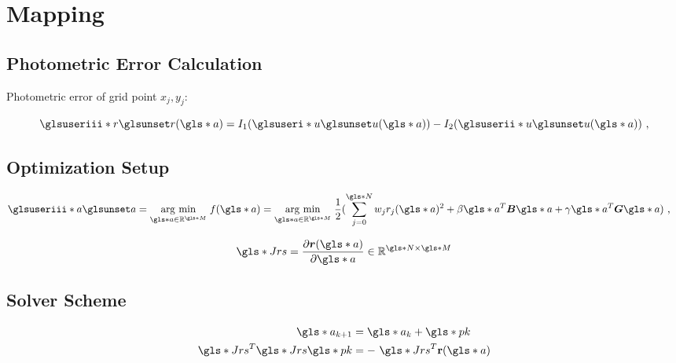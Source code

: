 \section{Mapping}

\subsection{Photometric Error Calculation}

Photometric error of grid point ${x_j}, {y_j}$:

\begin{equation*}
  \giii{r} (\g{a}) = I_1(\gi{u}(\g{a})) - I_2(\gii{u}(\g{a})) \text{ ,}
  \label{eq:photometric}
\end{equation*}

\subsection{Optimization Setup}
  
\begin{align*}
    \giii{a} &= \argmin{\g{a}\in\mathbb{R}^{\g{M}}} f(\g{a}) 
    = \argmin{\g{a}\in\mathbb{R}^{\g{M}}} \frac{1}{2} (\sum_{j = 0}^{\g{N}} 
    w_j r_j(\g{a})^2
    + \beta \g{a}^T \vc B \g{a}
    + \gamma \g{a}^T \vc G \g{a}) \text{ ,}
\end{align*}

\begin{equation*}
  \g{Jrs} = \frac{\partial \vc r(\g{a})}{\partial\g{a}}
  \in\mathbb{R}^{\g{N}\times\g{M}}
\end{equation*}

\subsection{Solver Scheme}
    
\begin{align*}
  \g{a}_{k+1} &= \g{a}_k + \g{pk}\\
  \g{Jrs}^T \g{Jrs} \g{pk} &= - \g{Jrs} ^T \mathbf r(\g{a})
\end{align*}


